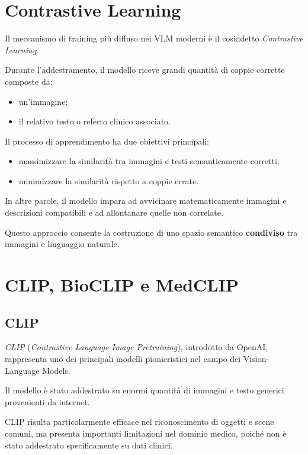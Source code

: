 \section{Contrastive Learning}

Il meccanismo di training più diffuso nei VLM moderni è il cosiddetto \textit{Contrastive Learning}.

Durante l'addestramento, il modello riceve grandi quantità di coppie corrette composte da:

\begin{itemize}
    \item un'immagine;
    \item il relativo testo o referto clinico associato.
\end{itemize}

Il processo di apprendimento ha due obiettivi principali:

\begin{itemize}
    \item massimizzare la similarità tra immagini e testi semanticamente corretti;
    \item minimizzare la similarità rispetto a coppie errate.
\end{itemize}

In altre parole, il modello impara ad avvicinare matematicamente immagini e descrizioni compatibili e ad allontanare quelle non correlate.

Questo approccio consente la costruzione di uno spazio semantico \textbf{condiviso} tra immagini e linguaggio naturale.

\section{CLIP, BioCLIP e MedCLIP}

\subsection{CLIP}

\textit{CLIP} (\textit{Contrastive Language-Image Pretraining}), introdotto da OpenAI, rappresenta uno dei principali modelli pionieristici nel campo dei Vision-Language Models.

Il modello è stato addestrato su enormi quantità di immagini e testo generici provenienti da internet.

CLIP risulta particolarmente efficace nel riconoscimento di oggetti e scene comuni, ma presenta importanti limitazioni nel dominio medico, poiché non è stato addestrato specificamente su dati clinici.

